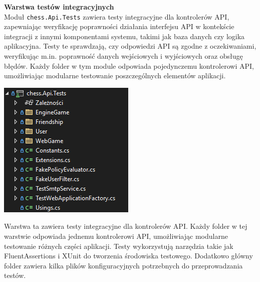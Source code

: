 \documentclass[twoside]{projektInzynierskiMS1}
\begin{document}
\newpage

\noindent \textbf{Warstwa testów integracyjnych}\\
Moduł \texttt{chess.Api.Tests} zawiera testy integracyjne dla kontrolerów API, zapewniając weryfikację poprawności działania interfejsu API w kontekście integracji z innymi komponentami systemu, takimi jak baza danych czy logika aplikacyjna. Testy te sprawdzają, czy odpowiedzi API są zgodne z oczekiwaniami, weryfikując m.in. poprawność danych wejściowych i wyjściowych oraz obsługę błędów. Każdy folder w tym module odpowiada pojedynczemu kontrolerowi API, umożliwiając modularne testowanie poszczególnych elementów aplikacji.

\vspace{0.5cm}
\noindent
\begin{minipage}[t]{0.4\textwidth}
    \vspace{0pt}
    \centering
    \includegraphics[width=\linewidth]{images/struktura_back_api_tests.png}
\end{minipage}
\hfill
\begin{minipage}[t]{0.55\textwidth}
    \vspace{0pt}
    \justifying
    \noindent
    Warstwa ta zawiera testy integracyjne dla kontrolerów API. Każdy folder w tej warstwie odpowiada jednemu kontrolerowi API, umożliwiając modularne testowanie różnych części aplikacji. Testy wykorzystują narzędzia takie jak FluentAssertions i XUnit do tworzenia środowiska testowego. Dodatkowo główny folder zawiera kilka plików konfiguracyjnych potrzebnych do przeprowadzania testów.
\end{minipage}
\vspace{0.5cm}
\end{document}
